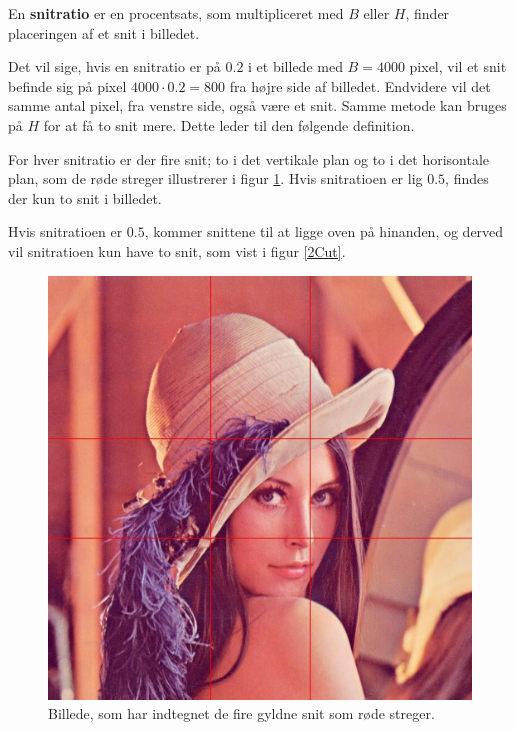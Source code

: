 {\begin{definition}
	En \textbf{snitratio} er en procentsats, som multipliceret med $B$ eller
	$H$, finder placeringen af et snit i billedet.
\end{definition}

Det vil sige, hvis en snitratio er på $0.2$ i et billede med $B =
4000$ pixel, vil et snit befinde sig på pixel $4000 \cdot 0.2 = 800$ fra højre side af
billedet. Endvidere vil det samme antal pixel, fra venstre side, også være et snit.
Samme metode kan bruges på $H$ for at få to snit mere. Dette leder til
den følgende definition.

\begin{definition}
	For hver snitratio er der fire snit; to i det vertikale plan og to i
	det horisontale plan, som de røde streger illustrerer i figur
    \ref{lenasnit2}. Hvis snitratioen er lig $0.5$, findes der kun to
    snit i billedet.
\end{definition}

Hvis snitratioen er $0.5$, kommer snittene til at ligge oven på hinanden,
og derved vil snitratioen kun have to snit, som vist i figur \ref{2Cut}.

\begin{figure}[!h]
    \centering
    \includegraphics[scale=0.42,angle=0]{afsnit/vores_implementation/billeder/naiv_algoritme/Lenagolden}
    \caption[]{Billede, som har indtegnet de fire gyldne snit som røde
    streger.}
    \label{lenasnit2}
\end{figure}

}
